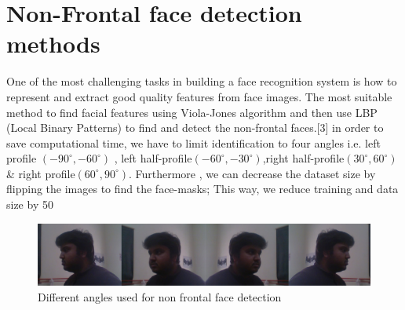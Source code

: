 \documentclass[12pt,a4paper]{article}
\begin{document}
\section{Non-Frontal face detection methods}
One of the most challenging tasks in building a face recognition system is how to represent and extract good quality features from face images. The most suitable method to find facial features using Viola-Jones algorithm and then use LBP (Local Binary Patterns) to find and detect the non-frontal faces.[3]
in order to save computational time, we have to limit identification to four angles i.e. left profile $(-90^{\circ},-60^{\circ})$ , left half-profile$(-60^{\circ},-30^{\circ})$,right half-profile$(30^{\circ},60^{\circ})$ \& right profile$(60^{\circ},90^{\circ})$. Furthermore , we can decrease the dataset size by flipping the images to find the face-masks; This way, we reduce training and data size by 50%
\begin{figure}[h!]
\centerline{\includegraphics[scale=0.3]{face.jpg}}
\caption{Different angles used for non frontal face detection}
\label{fig 5}
\end{figure}
\end{document}
